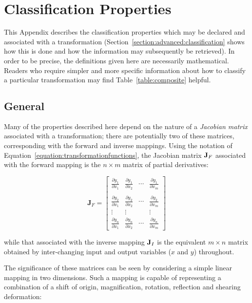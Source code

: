 \documentclass[twoside,11pt]{article}
\newcommand{\xlabel}[1]{}
\renewcommand{\_}{\texttt{\symbol{95}}}
\newcommand{\pdiff}[2]{\frac{\partial y_{#1}}{\partial x_{#2}}}
\begin{document}
\newpage
\section{\xlabel{classification_properties}Classification Properties}

\label{appendix:classification}

This Appendix describes the classification properties which may be declared
and associated with a transformation
(Section~\ref{section:advanced:classification} shows how this is done and
how the information may subsequently be retrieved).
In order to be precise, the definitions given here are necessarily
mathematical.
Readers who require simpler and more specific information about how to
classify a particular transformation may find Table~\ref{table:composite}
helpful.


\subsection{\xlabel{general}General}

Many of the properties described here depend on the nature of a \emph{Jacobian
matrix} associated with a transformation; there are potentially two
of these matrices, corresponding with the forward and inverse mappings.
Using the notation of Equation~\ref{equation:transformationfunctions}, the
Jacobian matrix ${\bf J}_F$ associated with the forward mapping is the
\mbox{$n \times m$} matrix of partial derivatives:

\begin{equation}
\textbf{J}_F = \left[ \begin{array}{cccc}
\pdiff{1}{1} & \pdiff{1}{2} & \cdots & \pdiff{1}{m} \\
             &              &        &              \\
\pdiff{2}{1} & \pdiff{2}{2} & \cdots & \pdiff{2}{m} \\
\vdots       & \vdots       &        & \vdots       \\
\pdiff{n}{1} & \pdiff{n}{2} & \cdots & \pdiff{n}{m}
\end{array} \right]
\end{equation}

while that associated with the inverse mapping ${\bf J}_I$ is the equivalent
\mbox{$m \times n$} matrix obtained by inter-changing input and output
variables ($x$ and $y$) throughout.

The significance of these matrices can be seen by considering a simple
linear mapping in two dimensions.
Such a mapping is capable of representing a combination of a shift of
origin, magnification, rotation, reflection and shearing deformation:
\end{document}
